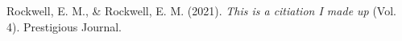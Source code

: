 \documentclass[a4paper,12pt]{article}
\begin{document}
%
%
%
%
%
%
%



%	
	
	
	
	
	
	
	
	\clearpage %
	\appendix
%	

\begin{thebibliography}{}
Rockwell, E. M., \& Rockwell, E. M. (2021). \emph{This is a citiation I made up} (Vol. 4). Prestigious Journal.


\end{thebibliography}
	
\end{document}

